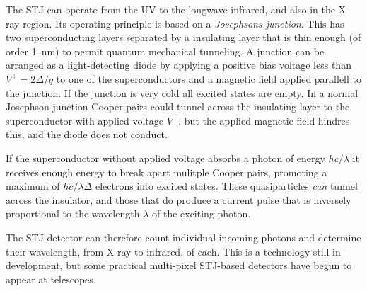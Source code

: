 The STJ can operate 
from the UV to the longwave infrared, and also in the X-ray region.
Its operating principle is based on a {\it Josephsons junction}. This has two 
superconducting layers separated by a insulating layer that is thin
enough (of order 1~nm) to permit quantum mechanical tunneling. A
junction can be arranged as a light-detecting diode by applying a
positive bias voltage less than $V^{+}=2\Delta/q$ to one of the
superconductors and a magnetic field applied parallell to the
junction. If the junction is very cold all excited states are
empty. In a normal Josephson junction Cooper pairs could tunnel across
the insulating layer to the superconductor with applied voltage
$V^{+}$, but the applied magnetic field hindres this, and the diode
does not conduct.

If the superconductor without applied voltage absorbs a photon of
energy $hc/\lambda$ it receives enough energy to break apart mulitple
Cooper pairs, promoting a maximum of $hc/\lambda\Delta$ electrons into
excited states. These quasiparticles {\it can} tunnel across the
insulator, and those that do produce a current pulse that is inversely
proportional to the wavelength $\lambda$ of the exciting photon.

The STJ detector can therefore count individual incoming photons and
determine their wavelength, from X-ray to infrared, of each. This is a
technology still in development, but some practical multi-pixel
STJ-based detectors have begun to appear at telescopes.


